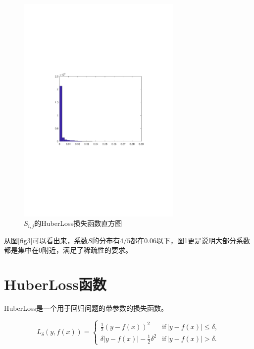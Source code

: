 \begin{figure}[H]
\centering
\includegraphics[width=8cm]{fig/128_42.pdf}
\caption{$S_{i,j}$的HuberLoss损失函数直方图}
\label{fig4}
\end{figure}

从图\ref{fig3}可以看出来，系数$S$的分布有$4/5$都在0.06以下，图\ref{fig4}更是说明大部分系数都是集中在0附近，满足了稀疏性的要求。

\appendix
{}
\section{HuberLoss函数}
HuberLoss是一个用于回归问题的带参数的损失函数。

\begin{equation*}
  L_{\delta}(y,f(x))=\left\{
    \begin{array}{ll}
    \frac{1}{2}(y-f(x))^2 & \text{if}\, |y-f(x)|\leq \delta, \\
      \delta|y-f(x)| -\frac{1}{2}\delta^2 & \text{if}\, |y-f(x)|> \delta.
    \end{array}
  \right.
\end{equation*}

